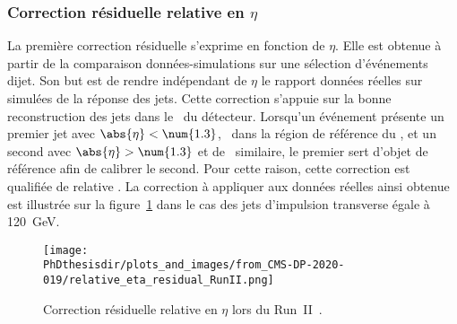 \subsubsection{Correction résiduelle relative en $\eta$}\label{chapter-JERC-section-CMS-subsec-residuals_eta}
La première correction résiduelle s'exprime en fonction de $\eta$.
Elle est obtenue à partir de la comparaison données-simulations sur une sélection d'événements dijet.
Son but est de rendre indépendant de $\eta$ le rapport données réelles sur simulées de la réponse des jets.
Cette correction s'appuie sur la bonne reconstruction des jets dans le \CMSbarrel\ du détecteur.
Lorsqu'un événement présente un premier jet avec $\abs{\eta}<\num{1.3}$, \ie\ dans la région de référence du \CMSbarrel, et un second avec $\abs{\eta}>\num{1.3}$ et de \pT\ similaire, le premier sert d'objet de référence afin de calibrer le second.
Pour cette raison, cette correction est qualifiée de \og relative \fg.
La correction à appliquer aux données réelles ainsi obtenue est illustrée sur la figure~\ref{fig-L2ResRel_RunII} dans le cas des jets d'impulsion transverse égale à \SI{120}{\GeV}.
\begin{figure}[h]
\centering
\texttt{[image: \\PhDthesisdir/plots\_and\_images/from\_CMS-DP-2020-019/relative\_eta\_residual\_RunII.png]}
\caption[Correction résiduelle relative en $\eta$ lors du Run~II.]{Correction résiduelle relative en $\eta$ lors du Run~II~\cite{CMS-DP-2020-019}.}
\label{fig-L2ResRel_RunII}
\end{figure}
